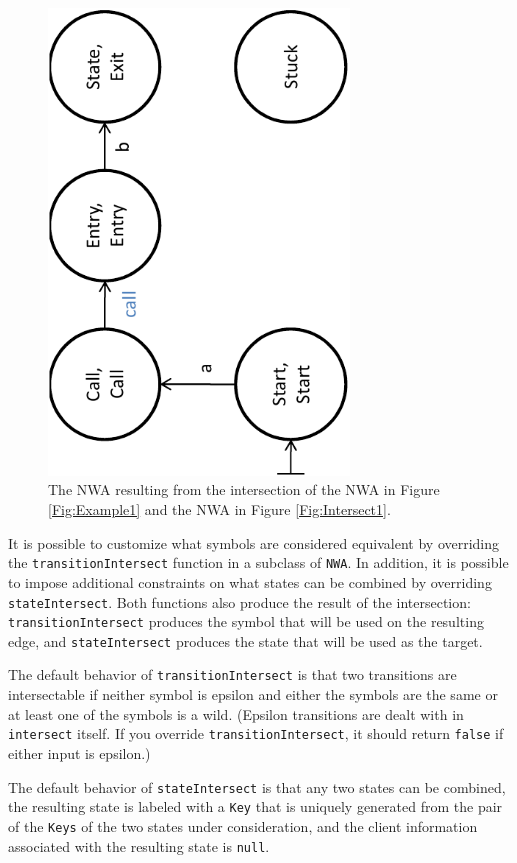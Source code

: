 \begin{figure}[htbp]
  \centering
    \includegraphics[width=8cm]{Figures/Figure6}
  \caption{The NWA resulting from the intersection of the NWA in Figure
    \ref{Fig:Example1} and the NWA in Figure \ref{Fig:Intersect1}.}
  \label{Fig:Intersect2}
\end{figure}

It is possible to customize what symbols are considered equivalent by
overriding the \texttt{transitionIntersect} function in a subclass of
\texttt{NWA}. In addition, it is possible to impose additional constraints on
what states can be combined by overriding \texttt{stateIntersect}. Both
functions also produce the result of the intersection:
\texttt{transitionIntersect} produces the symbol that will be used on the
resulting edge, and \texttt{stateIntersect} produces the state that will be
used as the target.

The default behavior of
\texttt{transitionIntersect} is that two transitions are intersectable if
neither symbol is epsilon and either the symbols are the same or at least one of
the symbols is a wild. (Epsilon transitions are dealt with in
\texttt{intersect} itself. If you override \texttt{transitionIntersect}, it
should return \texttt{false} if either input is epsilon.)

The default behavior of \texttt{stateIntersect} is that any two
states can be combined, the resulting state is labeled with a
\texttt{Key} that is uniquely generated from the pair of the \texttt{Keys} of
the two states under consideration, and the client information associated
with the resulting state is \texttt{null}.


